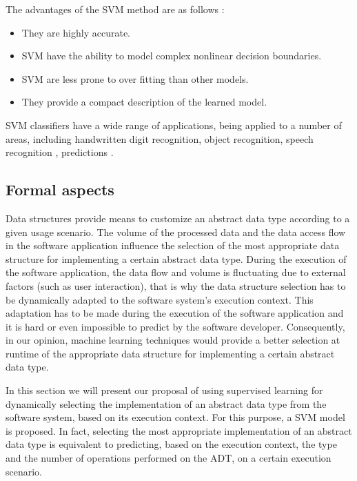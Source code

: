 The advantages of the SVM method are as follows \cite{wspsvm}:

\begin{itemize}

\item They are highly accurate.

\item SVM have the ability to model complex nonlinear decision
boundaries.

\item SVM are less prone to over fitting than other models.

\item They provide a compact description of the learned
model.

\end{itemize}

SVM classifiers have a wide range of applications, being applied to a number of areas, including handwritten
digit recognition, object recognition, speech recognition \cite{speech}, predictions \cite{wspsvm}.






\subsection{Formal aspects}\label{tm}

Data structures \cite{adt} provide means to customize an abstract data type according to a given usage scenario. The volume of the processed data and the data access flow in the software application influence the selection of the most appropriate data structure for implementing a certain abstract data type. During the execution of the software application, the data flow and volume is fluctuating due to external factors (such as user interaction), that is why the data structure selection has to be dynamically adapted to the software system's execution context. This adaptation has to be made during the execution of the software application and it is hard or even impossible to predict by the software developer. Consequently, in our opinion, machine learning techniques would provide a better selection at runtime of the appropriate data structure for implementing a certain abstract data type.

In this section we will present our proposal of using supervised learning for dynamically selecting the implementation of an abstract data type from the software system, based on its execution context. For this purpose, a SVM model is proposed. In fact, selecting the most appropriate implementation of an abstract data type is equivalent to predicting, based on the execution
context, the type and the number of operations performed on the ADT, on a certain execution scenario.

